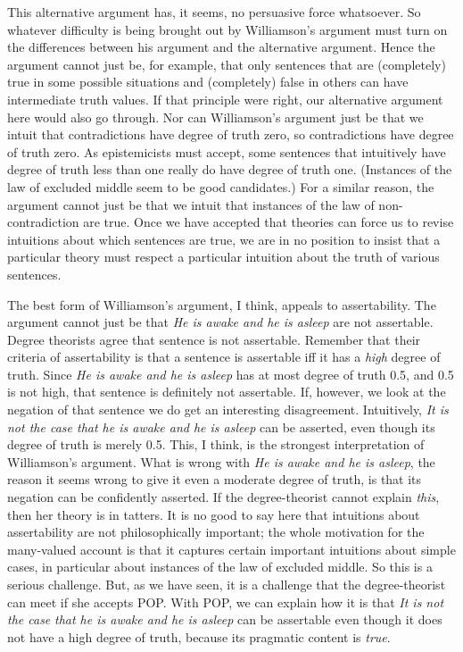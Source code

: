 \noindent This alternative argument has, it seems, no persuasive force whatsoever. So whatever difficulty is being brought out by Williamson's argument must turn on the differences between his argument and the alternative argument. Hence the argument cannot just be, for example, that only sentences that are (completely) true in some possible situations and (completely) false in others can have intermediate truth values. If that principle were right, our alternative argument here would also go through. Nor can Williamson's argument just be that we intuit that contradictions have degree of truth zero, so contradictions have degree of truth zero. As epistemicists must accept, some sentences that intuitively have degree of truth less than one really do have degree of truth one. (Instances of the law of excluded middle seem to be good candidates.) For a similar reason, the argument cannot just be that we intuit that instances of the law of non-contradiction are true. Once we have accepted that theories can force us to revise intuitions about which sentences are true, we are in no position to insist that a particular theory must respect a particular intuition about the truth of various sentences.

The best form of Williamson's argument, I think, appeals to assertability. The argument cannot just be that \textit{He is awake and he is asleep} are not assertable. Degree theorists agree that sentence is not assertable. Remember that their criteria of assertability is that a sentence is assertable iff it has a \textit{high} degree of truth. Since \textit{He is awake and he is asleep} has at most degree of truth 0.5, and 0.5 is not high, that sentence is definitely not assertable. If, however, we look at the negation of that sentence we do get an interesting disagreement. Intuitively, \textit{It is not the case that he is awake and he is asleep} can be asserted, even though its degree of truth is merely 0.5. This, I think, is the strongest interpretation of Williamson's argument. What is wrong with \textit{He is awake and he is asleep}, the reason it seems wrong to give it even a moderate degree of truth, is that its negation can be confidently asserted. If the degree-theorist cannot explain \textit{this}, then her theory is in tatters. It is no good to say here that intuitions about assertability are not philosophically important; the whole motivation for the many-valued account is that it captures certain important intuitions about simple cases, in particular about instances of the law of excluded middle. So this is a serious challenge. But, as we have seen, it is a challenge that the degree-theorist can meet if she accepts POP. With POP, we can explain how it is that \textit{It is not the case }\textit{that he is awake and he is asleep} can be assertable even though it does not have a high degree of truth, because its pragmatic content is \textit{true}.

